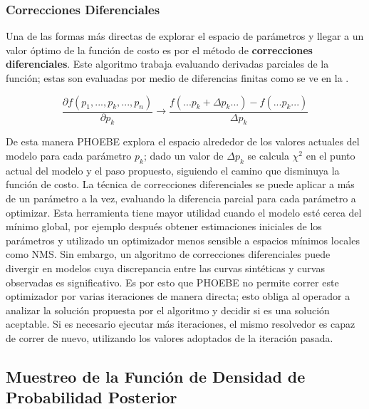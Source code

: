 \subsubsection{Correcciones Diferenciales}

Una de las formas más directas de explorar el espacio de parámetros y llegar a
un valor óptimo de la función de costo es por el método de \textbf{correcciones
diferenciales}. Este algoritmo trabaja evaluando derivadas parciales de la
función; estas son evaluadas por medio de diferencias finitas como se ve en la
.

\begin{eqfloat}[!ht]
	\centering
	\begin{equation}
		\frac{\partial f(p_1,...,p_k,...,p_n)}{\partial p_k} \rightarrow \frac{f(...p_k + \Delta p_k...) - f(...p_k...)}{\Delta p_k}
	\end{equation}
	\blankcaption
	\vspace{-0.4em}
	\label{ecuacionDiferenciasFinitas}
\end{eqfloat}

De esta manera PHOEBE explora el espacio alrededor de los valores actuales del
modelo para cada parámetro $p_k$; dado un valor de $\Delta p_k$ se calcula
$\chi^2$ en el punto actual del modelo y el paso propuesto, siguiendo el camino
que disminuya la función de costo. La técnica de correcciones diferenciales se
puede aplicar a más de un parámetro a la vez, evaluando la diferencia parcial
para cada parámetro a optimizar. Esta herramienta tiene mayor utilidad cuando el
modelo esté cerca del mínimo global, por ejemplo después obtener estimaciones
iniciales de los parámetros y utilizado un optimizador menos sensible a espacios
mínimos locales como NMS. Sin embargo, un algoritmo de correcciones
diferenciales puede divergir en modelos cuya discrepancia entre las curvas
sintéticas y curvas observadas es significativo. Es por esto que PHOEBE no
permite correr este optimizador por varias iteraciones de manera directa; esto
obliga al operador a analizar la solución propuesta por el algoritmo y decidir
si es una solución aceptable. Si es necesario ejecutar más iteraciones, el mismo
resolvedor es capaz de correr de nuevo, utilizando los valores adoptados de la
iteración pasada.

\subsection{Muestreo de la Función de Densidad de Probabilidad Posterior}

